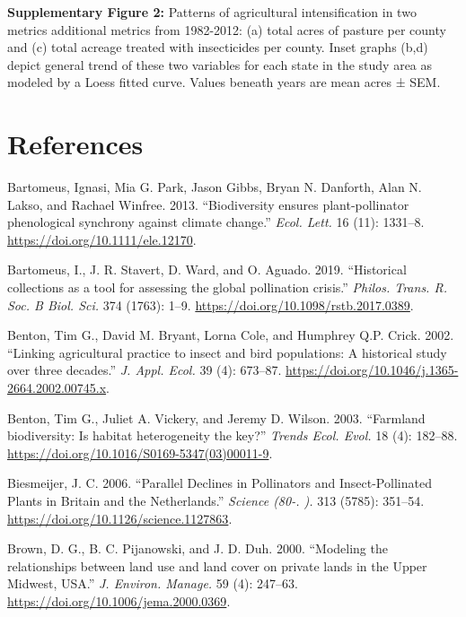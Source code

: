 \documentclass[11pt,]{article}
\begin{document}
\textbf{Supplementary Figure 2:} Patterns of agricultural
intensification in two metrics additional metrics from 1982-2012: (a)
total acres of pasture per county and (c) total acreage treated with
insecticides per county. Inset graphs (b,d) depict general trend of
these two variables for each state in the study area as modeled by a
Loess fitted curve. Values beneath years are mean acres ± SEM.

\clearpage

\hypertarget{references}{%
\section*{References}\label{references}}

\hypertarget{refs}{}
\leavevmode\hypertarget{ref-Bartomeus2013}{}%
Bartomeus, Ignasi, Mia G. Park, Jason Gibbs, Bryan N. Danforth, Alan N.
Lakso, and Rachael Winfree. 2013. ``Biodiversity ensures
plant-pollinator phenological synchrony against climate change.''
\emph{Ecol. Lett.} 16 (11): 1331--8.
\url{https://doi.org/10.1111/ele.12170}.

\leavevmode\hypertarget{ref-Bartomeus2019}{}%
Bartomeus, I., J. R. Stavert, D. Ward, and O. Aguado. 2019. ``Historical
collections as a tool for assessing the global pollination crisis.''
\emph{Philos. Trans. R. Soc. B Biol. Sci.} 374 (1763): 1--9.
\url{https://doi.org/10.1098/rstb.2017.0389}.

\leavevmode\hypertarget{ref-Benton2002}{}%
Benton, Tim G., David M. Bryant, Lorna Cole, and Humphrey Q.P. Crick.
2002. ``Linking agricultural practice to insect and bird populations: A
historical study over three decades.'' \emph{J. Appl. Ecol.} 39 (4):
673--87. \url{https://doi.org/10.1046/j.1365-2664.2002.00745.x}.

\leavevmode\hypertarget{ref-Benton2003}{}%
Benton, Tim G., Juliet A. Vickery, and Jeremy D. Wilson. 2003.
``Farmland biodiversity: Is habitat heterogeneity the key?''
\emph{Trends Ecol. Evol.} 18 (4): 182--88.
\url{https://doi.org/10.1016/S0169-5347(03)00011-9}.

\leavevmode\hypertarget{ref-Biesmeijer2006}{}%
Biesmeijer, J. C. 2006. ``Parallel Declines in Pollinators and
Insect-Pollinated Plants in Britain and the Netherlands.'' \emph{Science
(80-. ).} 313 (5785): 351--54.
\url{https://doi.org/10.1126/science.1127863}.

\leavevmode\hypertarget{ref-Brown2000}{}%
Brown, D. G., B. C. Pijanowski, and J. D. Duh. 2000. ``Modeling the
relationships between land use and land cover on private lands in the
Upper Midwest, USA.'' \emph{J. Environ. Manage.} 59 (4): 247--63.
\url{https://doi.org/10.1006/jema.2000.0369}.
\end{document}
